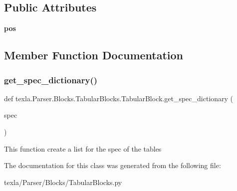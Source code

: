 \subsection*{Public Attributes}
\begin{DoxyCompactItemize}
\item 
\hypertarget{classtexla_1_1Parser_1_1Blocks_1_1TabularBlocks_1_1TabularBlock_a111dd079fecc68bde1e245608fb10c7f}{}\label{classtexla_1_1Parser_1_1Blocks_1_1TabularBlocks_1_1TabularBlock_a111dd079fecc68bde1e245608fb10c7f} 
{\bfseries pos}
\end{DoxyCompactItemize}


\subsection{Member Function Documentation}
\hypertarget{classtexla_1_1Parser_1_1Blocks_1_1TabularBlocks_1_1TabularBlock_a44ef251d20c1365275ab9ffeda057f69}{}\label{classtexla_1_1Parser_1_1Blocks_1_1TabularBlocks_1_1TabularBlock_a44ef251d20c1365275ab9ffeda057f69} 
\subsubsection{\texorpdfstring{get\+\_\+spec\+\_\+dictionary()}{get\_spec\_dictionary()}}
{\footnotesize\ttfamily def texla.\+Parser.\+Blocks.\+Tabular\+Blocks.\+Tabular\+Block.\+get\+\_\+spec\+\_\+dictionary (\begin{DoxyParamCaption}\item[{}]{spec }\end{DoxyParamCaption})\hspace{0.3cm}{\ttfamily [static]}}

\begin{DoxyVerb}This function create  a list for the spec of the tables
\end{DoxyVerb}
 

The documentation for this class was generated from the following file\+:\begin{DoxyCompactItemize}
\item 
texla/\+Parser/\+Blocks/Tabular\+Blocks.\+py\end{DoxyCompactItemize}
